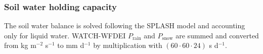 \documentclass{myreport}
\begin{document}
\subsubsection{Soil water holding capacity}

The soil water balance is solved following the SPLASH model and accounting only for liquid water. WATCH-WFDEI $P_{\text{rain}}$ and $P_{\text{snow}}$ are summed and converted from kg m$^{-2}$ s$^{-1}$ to mm d$^{-1}$ by multiplication with $(60 \cdot 60 \cdot 24)$ s d$^{-1}$. 




\end{document}
